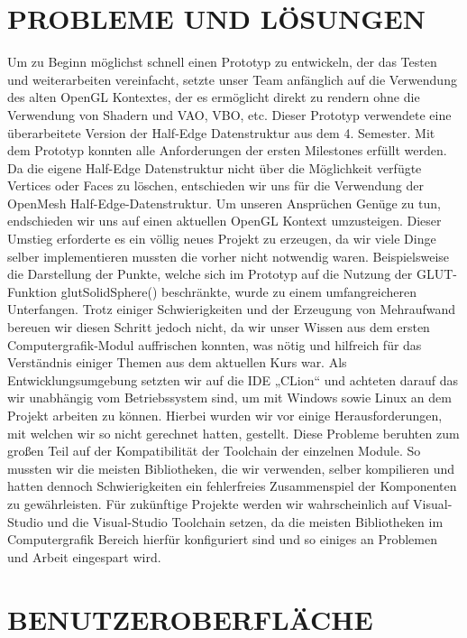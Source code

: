 	\section{\Large PROBLEME UND LÖSUNGEN}
Um zu Beginn möglichst schnell einen Prototyp zu entwickeln, der das Testen und weiterarbeiten vereinfacht, setzte unser Team anfänglich auf die Verwendung des alten OpenGL Kontextes, der es ermöglicht direkt zu rendern ohne die Verwendung von Shadern und VAO, VBO, etc. Dieser Prototyp verwendete eine überarbeitete Version der Half-Edge Datenstruktur aus dem 4. Semester. Mit dem Prototyp konnten alle Anforderungen der ersten Milestones erfüllt werden. \newline
Da die eigene Half-Edge Datenstruktur nicht über die Möglichkeit verfügte Vertices oder Faces zu löschen, entschieden wir uns für die Verwendung der OpenMesh Half-Edge-Datenstruktur.\newline
Um unseren Ansprüchen Genüge zu tun, endschieden wir uns auf einen aktuellen OpenGL Kontext umzusteigen. Dieser Umstieg erforderte es ein völlig neues Projekt zu erzeugen, da wir viele Dinge selber implementieren mussten die vorher nicht notwendig waren. Beispielsweise die Darstellung der Punkte, welche sich im Prototyp auf die Nutzung der GLUT-Funktion glutSolidSphere() beschränkte, wurde zu einem umfangreicheren Unterfangen. Trotz einiger Schwierigkeiten und der Erzeugung von Mehraufwand bereuen wir diesen Schritt jedoch nicht, da wir unser Wissen aus dem ersten Computergrafik-Modul auffrischen konnten, was nötig und hilfreich für das Verständnis einiger Themen aus dem aktuellen Kurs war.\newline
Als Entwicklungsumgebung setzten wir auf die IDE „CLion“ und achteten darauf das wir unabhängig vom Betriebssystem sind, um mit Windows sowie Linux an dem Projekt arbeiten zu können. Hierbei wurden wir vor einige Herausforderungen, mit welchen wir so nicht gerechnet hatten, gestellt. Diese Probleme beruhten zum großen Teil auf der Kompatibilität der Toolchain der einzelnen Module. So mussten wir die meisten Bibliotheken, die wir verwenden, selber kompilieren und hatten dennoch Schwierigkeiten ein fehlerfreies Zusammenspiel der Komponenten zu gewährleisten. Für zukünftige Projekte werden wir wahrscheinlich auf Visual-Studio und die Visual-Studio Toolchain setzen, da die meisten Bibliotheken im Computergrafik Bereich hierfür konfiguriert sind und so einiges an Problemen und Arbeit eingespart wird.

	
	\section{\Large BENUTZEROBERFLÄCHE}
	
	

	

		
